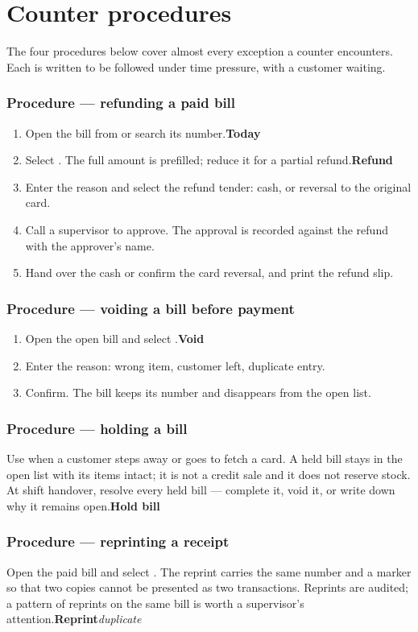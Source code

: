 \documentclass[11pt,a4paper,oneside]{book}
\begin{document}
\section*{Counter procedures}
The four procedures below cover almost every exception a counter encounters. Each is written to be followed under time pressure, with a customer waiting.

\subsubsection*{Procedure — refunding a paid bill}
\begin{enumerate}
\item Open the bill from  or search its number.\textbf{Today}
\item Select . The full amount is prefilled; reduce it for a partial refund.\textbf{Refund}
\item Enter the reason and select the refund tender: cash, or reversal to the original card.
\item Call a supervisor to approve. The approval is recorded against the refund with the approver's name.
\item Hand over the cash or confirm the card reversal, and print the refund slip.
\end{enumerate}
\subsubsection*{Procedure — voiding a bill before payment}
\begin{enumerate}
\item Open the open bill and select .\textbf{Void}
\item Enter the reason: wrong item, customer left, duplicate entry.
\item Confirm. The bill keeps its number and disappears from the open list.
\end{enumerate}
\subsubsection*{Procedure — holding a bill}
Use  when a customer steps away or goes to fetch a card. A held bill stays in the open list with its items intact; it is not a credit sale and it does not reserve stock. At shift handover, resolve every held bill — complete it, void it, or write down why it remains open.\textbf{Hold bill}

\subsubsection*{Procedure — reprinting a receipt}
Open the paid bill and select . The reprint carries the same number and a  marker so that two copies cannot be presented as two transactions. Reprints are audited; a pattern of reprints on the same bill is worth a supervisor's attention.\textbf{Reprint}\emph{duplicate}
\end{document}
